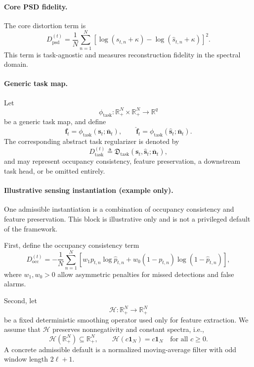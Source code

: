 \documentclass[11pt]{article}
\begin{document}
\paragraph{Core PSD fidelity.}
The core distortion term is
\begin{equation}
D_{\mathrm{psd}}^{(t)}
=
\frac{1}{N}
\sum_{n=1}^{N}
\left[
\log(s_{t,n}+\kappa)-\log(\hat{s}_{t,n}+\kappa)
\right]^2.
\end{equation}
This term is task-agnostic and measures reconstruction fidelity in the spectral domain.

\paragraph{Generic task map.}
Let
\begin{equation}
\phi_{\mathrm{task}} :
\mathbb{R}_{+}^{N} \times \mathbb{R}_{+}^{N}
\to
\mathbb{R}^{q}
\end{equation}
be a generic task map, and define
\begin{equation}
\mathbf{f}_t
=
\phi_{\mathrm{task}}(\mathbf{s}_t;\bar{\mathbf{n}}_t),
\qquad
\hat{\mathbf{f}}_t
=
\phi_{\mathrm{task}}(\hat{\mathbf{s}}_t;\bar{\mathbf{n}}_t).
\end{equation}
The corresponding abstract task regularizer is denoted by
\begin{equation}
D_{\mathrm{task}}^{(t)}
\triangleq
\mathfrak{D}_{\mathrm{task}}(\mathbf{s}_t,\hat{\mathbf{s}}_t;\bar{\mathbf{n}}_t),
\end{equation}
and may represent occupancy consistency, feature preservation, a downstream task head, or be
omitted entirely.

\paragraph{Illustrative sensing instantiation (example only).}
One admissible instantiation is a combination of occupancy consistency and feature preservation.
This block is illustrative only and is not a privileged default of the framework.

First, define the occupancy consistency term
\begin{equation}
D_{\mathrm{occ}}^{(t)}
=
-\frac{1}{N}
\sum_{n=1}^{N}
\left[
w_{1}p_{t,n}\log \hat{p}_{t,n}
+
w_{0}(1-p_{t,n})\log(1-\hat{p}_{t,n})
\right],
\end{equation}
where $w_{1},w_{0} > 0$ allow asymmetric penalties for missed detections and false alarms.

Second, let
\begin{equation}
\mathcal{H} : \mathbb{R}_{+}^{N} \to \mathbb{R}_{+}^{N}
\end{equation}
be a fixed deterministic smoothing operator used only for feature extraction. We assume that
$\mathcal{H}$ preserves nonnegativity and constant spectra, i.e.,
\begin{equation}
\mathcal{H}(\mathbb{R}_{+}^{N}) \subseteq \mathbb{R}_{+}^{N},
\qquad
\mathcal{H}(c\mathbf{1}_N)=c\mathbf{1}_N
\quad
\text{for all } c \ge 0.
\end{equation}
A concrete admissible default is a normalized moving-average filter with odd window length
$2\ell+1$.
\end{document}
